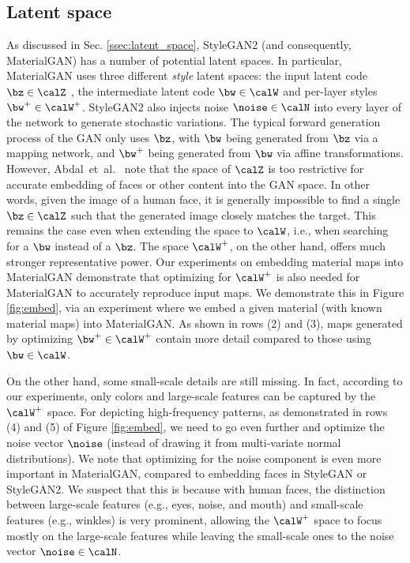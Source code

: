 \subsection{Latent space}
\label{ssec:latent}
%
As discussed in Sec. \ref{ssec:latent_space}, StyleGAN2 (and consequently, MaterialGAN) has a number of potential latent spaces.
In particular, MaterialGAN uses three different \emph{style} latent spaces: the input latent code $\bz \in \calZ$ , the intermediate latent code $\bw \in \calW$ and per-layer styles $\bw^+ \in \calW^+$.
StyleGAN2 also injects noise $\noise \in \calN$ into every layer of the network to generate stochastic variations.
%
The typical forward generation process of the GAN only uses $\bz$, with $\bw$ being generated from $\bz$ via a mapping network, and $\bw^+$ being generated from $\bw$ via affine transformations.
However, Abdal~et~al.~ note that the space of $\calZ$ is too restrictive for accurate embedding of faces or other content into the GAN space.
In other words, given the image of a human face, it is generally impossible to find a single $\bz \in \calZ$ such that the generated image closely matches the target.
This remains the case even when extending the space to $\calW$, i.e., when searching for a $\bw$ instead of a $\bz$.
The space $\calW^+$, on the other hand, offers much stronger representative power.
%
Our experiments on embedding material maps into MaterialGAN demonstrate that optimizing for $\calW^+$ is also needed for MaterialGAN to accurately reproduce input maps.
We demonstrate this in Figure \ref{fig:embed}, via an experiment where we embed a given material (with known material maps) into MaterialGAN.
As shown in rows (2) and (3), maps generated by optimizing $\bw^+ \in \calW^+$ contain more detail compared to those using $\bw \in \calW$.
%

%
On the other hand, some small-scale details are still missing.
In fact, according to our experiments, only colors and large-scale features can be captured by the $\calW^+$ space.
For depicting high-frequency patterns, as demonstrated in rows (4) and (5) of Figure \ref{fig:embed}, we need to go even further and optimize the noise vector $\noise$ (instead of drawing it from multi-variate normal distributions).
We note that optimizing for the noise component is even more important in MaterialGAN, compared to embedding faces in StyleGAN or StyleGAN2.
We suspect that this is because with human faces, the distinction between large-scale features (e.g., eyes, noise, and mouth) and small-scale features (e.g., winkles) is very prominent, allowing the $\calW^+$ space to focus mostly on the large-scale features while leaving the small-scale ones to the noise vector $\noise \in \calN$.
